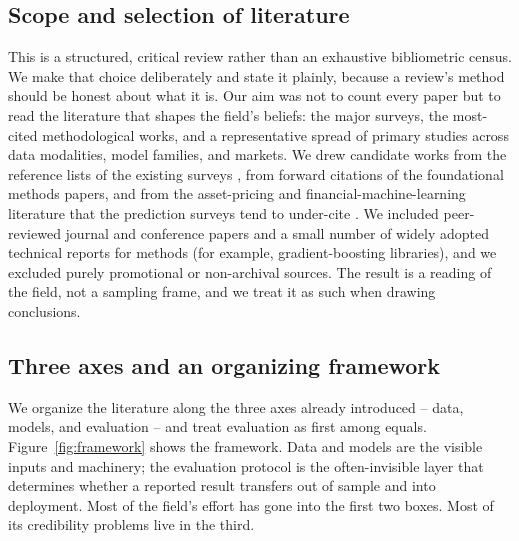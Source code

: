 \documentclass[10pt,a4paper,twocolumn]{article}
\begin{document}
\subsection{Scope and selection of literature}

This is a structured, critical review rather than an exhaustive bibliometric census. We make that choice deliberately and state it plainly, because a review's method should be honest about what it is. Our aim was not to count every paper but to read the literature that shapes the field's beliefs: the major surveys, the most-cited methodological works, and a representative spread of primary studies across data modalities, model families, and markets. We drew candidate works from the reference lists of the existing surveys \cite{sezer2020,ozbayoglu2020,jiang2021,bustos2020,kumbure2022,nti2020,thakkar2021,gandhmal2019}, from forward citations of the foundational methods papers, and from the asset-pricing and financial-machine-learning literature that the prediction surveys tend to under-cite \cite{gu2020,lopezdeprado2018}. We included peer-reviewed journal and conference papers and a small number of widely adopted technical reports for methods (for example, gradient-boosting libraries), and we excluded purely promotional or non-archival sources. The result is a reading of the field, not a sampling frame, and we treat it as such when drawing conclusions.

\subsection{Three axes and an organizing framework}

We organize the literature along the three axes already introduced -- data, models, and evaluation -- and treat evaluation as first among equals. Figure~\ref{fig:framework} shows the framework. Data and models are the visible inputs and machinery; the evaluation protocol is the often-invisible layer that determines whether a reported result transfers out of sample and into deployment. Most of the field's effort has gone into the first two boxes. Most of its credibility problems live in the third.
\end{document}
